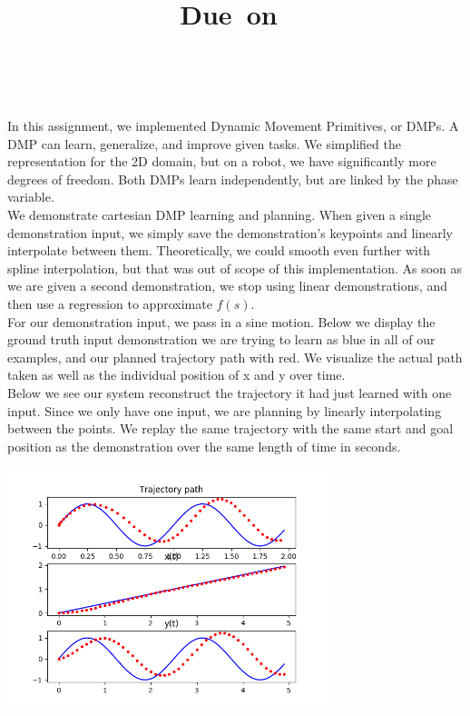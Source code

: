 \documentclass[12pt]{article}
\title{\textmd{\bf \Class\\ \Title}\\\vspace{0.1in}\small{Due\ on\ \DueDate}}
\date{}
\author{\textbf{\StudentName}\ \ \StudentClass\ \ \StudentNumber}
\begin{document}
\maketitle \thispagestyle{empty}

In this assignment, we implemented Dynamic Movement Primitives, or DMPs. A DMP can learn, generalize, and improve given tasks. We simplified the representation for the 2D domain, but on a robot, we have significantly more degrees of freedom. Both DMPs learn independently, but are linked by the phase variable. \\

We demonstrate cartesian DMP learning and planning. When given a single demonstration input, we simply save the demonstration's keypoints and linearly interpolate between them. Theoretically, we could smooth even further with spline interpolation, but that was out of scope of this implementation. As soon as we are given a second demonstration, we stop using linear demonstrations, and then use a regression to approximate $f(s)$. \\

For our demonstration input, we pass in a sine motion. Below we display the ground truth input demonstration we are trying to learn as blue in all of our examples, and our planned trajectory path with red. We visualize the actual path taken as well as the individual position of x and y over time. \\

Below we see our system reconstruct the trajectory it had just learned with one input. Since we only have one input, we are planning by linearly interpolating between the points. We replay the same trajectory with the same start and goal position as the demonstration over the same length of time in seconds.

\begin{center}
	\includegraphics[width=0.7\textwidth]{linear_demonstration}
\end{center}
\end{document}
